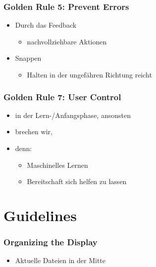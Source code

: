 \begin{frame}

\frametitle{Golden Rule 5: Prevent Errors}
\label{goldenrule5:preventerrors}

\begin{itemize}
\item Durch das Feedback

\begin{itemize}
\item nachvollziehbare Aktionen

\end{itemize}

\item Snappen

\begin{itemize}
\item Halten in der ungefähren Richtung reicht

\end{itemize}

\end{itemize}

\end{frame}

\begin{frame}

\frametitle{Golden Rule 7: User Control}
\label{goldenrule7:usercontrol}

\begin{itemize}
\item in der Lern-\slash Anfangsphase, ansonsten

\item brechen wir,

\item denn:

\begin{itemize}
\item Maschinelles Lernen

\item Bereitschaft sich helfen zu lassen

\end{itemize}

\end{itemize}

\end{frame}

\section{Guidelines}
\label{guidelines}

\begin{frame}

\frametitle{Organizing the Display}
\label{organizingthedisplay}

\begin{itemize}
\item Aktuelle Dateien in der Mitte

\end{itemize}

\end{frame}

